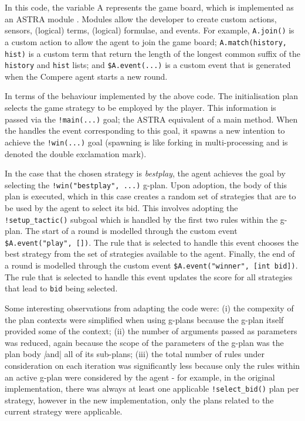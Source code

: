 In this code, the variable A represents the game board, which is implemented
as an ASTRA module \cite{DBLP:conf/prima/CollierRL15}. Modules allow the developer
to create custom actions, sensors, (logical) terms, (logical) formulae, and events.
For example, \verb|A.join()| is a custom action to allow the agent to join the
game board; \verb|A.match(history, hist)| is a custom term that return the length
of the longest common suffix of the \verb|history| and \verb|hist| lists; and
\verb|$A.event(...)| is a custom event that is generated when the Compere agent
starts a new round.

In terms of the behaviour implemented by the above code. The initialisation plan
selects the game strategy to be employed by the player. This information is
passed via the \verb|!main(...)| goal; the ASTRA equivalent of a main method.
When the handles the event corresponding to this goal, it spawns a new intention
to achieve the \verb|!win(...)| goal (spawning is like forking in multi-processing
and is denoted the double exclamation mark).

In the case that the chosen strategy is \emph{bestplay}, the agent achieves the goal 
by selecting the \verb|!win("bestplay", ...)| g-plan. Upon adoption, the body of this
plan is executed, which in this case creates a random set of strategies that are to
be used by the agent to select its bid. This involves adopting the \verb|!setup_tactic()|
subgoal which is handled by the first two rules within the g-plan. The start of a
round is modelled through the custom event \verb|$A.event("play", [])|. The rule that
is selected to handle this event chooses the best strategy from the set of strategies
available to the agent. Finally, the end of a round is modelled through the custom event
\verb|$A.event("winner", [int bid])|. The rule that is selected to handle this event
updates the score for all strategies that lead to \verb|bid| being selected.

Some interesting observations from adapting the code were: (i) the compexity of the
plan contexts were simplified when using g-plans because the g-plan itself provided 
some of the context; (ii) the number of arguments passed as parameters was reduced,
again because the scope of the parameters of the g-plan was the plan body \emph|and|
all of its sub-plans; (iii) the total number of rules under consideration on each
iteration was significantly less because only the rules within an active g-plan were
considered by the agent - for example, in the original implementation, there was always
at least one applicable \verb|!select_bid()| plan per strategy, however in the new 
implementation, only the plans related to the current strategy were applicable.

